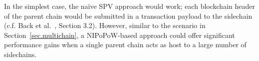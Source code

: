 In the simplest case, the na\"ive SPV approach would work; each blockchain header of the parent chain would be submitted in a transaction payload to the sidechain (c.f. Back et al.~\cite{sidechains}, Section 3.2). However, similar to the scenario in Section~\ref{sec.multichain}, a NIPoPoW-based approach could offer significant performance gains when a single parent chain acts as host to a large number of sidechains.
